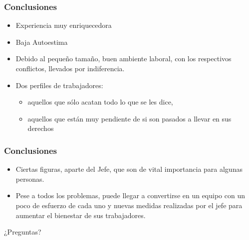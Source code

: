 \frame
{
\frametitle{Conclusiones}

\begin{itemize}
	\item Experiencia muy enriquecedora
	
	\item Baja Autoestima
	
	\item Debido al pequeño tamaño, buen ambiente laboral, con los respectivos conflictos, llevados por indiferencia.
	
	\item Dos perfiles de trabajadores:
	
	\begin{itemize}
		\item aquellos que sólo acatan todo lo que se les dice, 
		\item aquellos que están muy pendiente de si son pasados a llevar en sus derechos
	\end{itemize}

\end{itemize}

}

\frame
{
\frametitle{Conclusiones}

\begin{itemize}

	\item Ciertas figuras, aparte del Jefe, que son de vital importancia para algunas
	personas.
	 
	\item Pese a todos los problemas, puede llegar a convertirse en un equipo con un poco de esfuerzo de cada uno y nuevas medidas realizadas por el jefe para
aumentar el bienestar de sus trabajadores.

\end{itemize}

}

\frame
{
\vspace{2cm}
\begin{center}
	\Huge ¿Preguntas?
\end{center}
}
